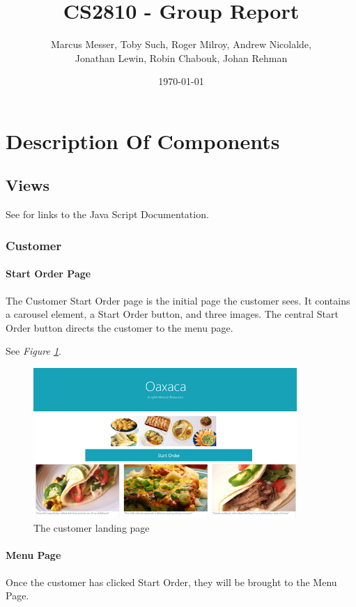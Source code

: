 \documentclass[12pt, twoside, a4paper]{report}
\title{CS2810 - Group Report}
\author{Marcus Messer, Toby Such, Roger Milroy, Andrew Nicolalde,\\
Jonathan Lewin, Robin Chabouk, Johan Rehman}
\date{\today}
\begin{document}
\maketitle
\pagestyle{fancy}
\fancyhf{}

\chapter*{Description Of Components}
\section*{Views}
See \textit{} for links to the Java Script Documentation.
\subsection*{Customer}
\subsubsection*{Start Order Page}
The Customer Start Order page is the initial page the customer sees.
It contains a carousel element, a Start Order button, and three images. The central Start Order button directs the customer to the menu page. 

See \textit{Figure \ref{fig:startOrder}}.

\begin{figure}[H]
  \centering
  \includegraphics[width=10cm]{startOrder.png}
  \caption{The customer landing page}
  \label{fig:startOrder}
\end{figure}

\subsubsection*{Menu Page}
Once the customer has clicked Start Order, they will be brought to the Menu Page.
\end{document}
